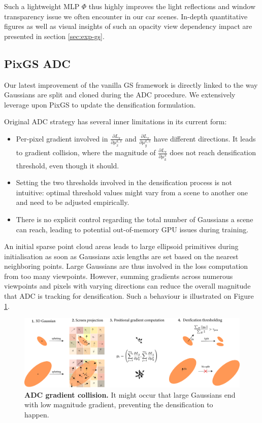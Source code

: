 Such a lightweight \ac{MLP} $\Phi$ thus highly improves the light reflections and window transparency issue we often encounter in our car scenes. In-depth quantitative figures as well as visual insights of such an opacity view dependency impact are presented in section \ref{sec:exp-gs}. 

\subsection{PixGS ADC}
\label{gs:pixgs-adc}
Our latest improvement of the vanilla GS framework is directly linked to the way Gaussians are split and cloned during the \ac{ADC} procedure. We extensively leverage upon PixGS \citep{zhang2024pixelgs} to update the densification formulation.  

Original \ac{ADC} strategy has several inner limitations in its current form: 
\begin{itemize}
    \item Per-pixel gradient involved in $\frac{\partial L_{\pi}}{\partial \mu^{k,\pi}_{x}}$ and $\frac{\partial L_{\pi}}{\partial \mu^{k,\pi}_{y}}$  have different directions. It leads to gradient collision, where the magnitude of $\frac{\partial L_{\pi}}{\partial \mu_{k}^{\pi}}$ does not reach densification threshold, even though it should. 
    \item Setting the two thresholds involved in the densification process is not intuitive: optimal threshold values might vary from a scene to another one and need to be adjusted empirically.
    \item There is no explicit control regarding the total number of Gaussians a scene can reach, leading to potential out-of-memory \ac{GPU} issues during training.
\end{itemize}

An initial sparse point cloud areas leads to large ellipsoid primitives during initialisation as soon as Gaussians axis lengths are set based on the nearest neighboring points. Large Gaussians are thus involved in the loss computation from too many viewpoints. However, summing gradients across numerous viewpoints and pixels with varying directions can reduce the overall magnitude that \ac{ADC} is tracking for densification. Such a behaviour is illustrated on Figure \ref{fig:adc-limitation}. 

\begin{figure}[htbp!]
    \center
  \includegraphics[width=\linewidth]{images/gaussiansplatting/adc_limitation_NEW.png}
  \caption{\textbf{ADC gradient collision.} It might occur that large Gaussians end with low magnitude gradient, preventing the densification to happen.}
  \label{fig:adc-limitation}
\end{figure}


